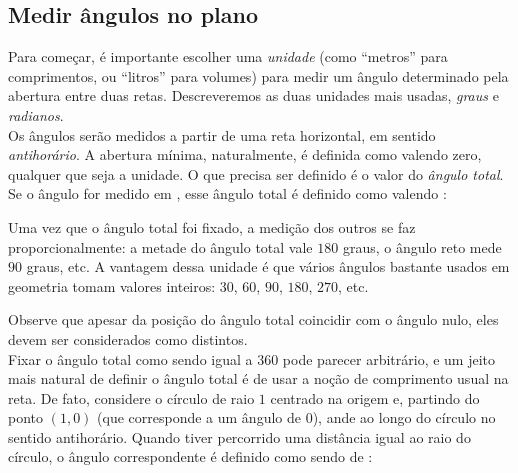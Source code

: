 \subsection{Medir ângulos no plano}

 Para começar, é importante escolher uma \emph{unidade} (como ``metros'' para
comprimentos, ou ``litros'' para volumes) para medir um ângulo
determinado pela abertura entre duas retas.
Descreveremos as duas unidades mais usadas, \emph{graus} e \emph{radianos}.\\

Os ângulos serão medidos a partir de uma reta horizontal, em sentido
\emph{antihorário}.  A abertura mínima, naturalmente, é definida como
valendo zero, qualquer que seja a unidade.
O que precisa ser definido é o valor do \emph{ângulo total}.
Se o ângulo for medido em , 
esse ângulo total é definido como valendo :
\begin{center}
\begin{bmlimage}\end{bmlimage}
\end{center}
 Uma vez que o ângulo total foi fixado, a medição dos outros se faz proporcionalmente: a
metade do ângulo total vale $180$ graus, o ângulo reto mede $90$ graus, etc.
A vantagem dessa unidade é que vários ângulos bastante usados em geometria tomam valores
inteiros: $30$, $60$, $90$, $180$, $270$, etc.
\begin{center}                                                                          
\begin{bmlimage}\end{bmlimage}
\end{center}
Observe que apesar da posição do ângulo total coincidir com o ângulo
nulo, eles devem ser considerados como distintos.\\

Fixar o ângulo total como sendo igual a $360$ pode parecer arbitrário,
e um jeito mais natural de definir o ângulo total é de usar a
noção de comprimento usual na reta.
De fato, considere o 
círculo de raio $1$ centrado na origem e, partindo do ponto $(1,0)$ (que corresponde
a um ângulo de $0$), 
ande ao longo do círculo no sentido antihorário. Quando tiver
percorrido uma distância igual ao raio do círculo, o ângulo
correspondente é definido como sendo de : 


